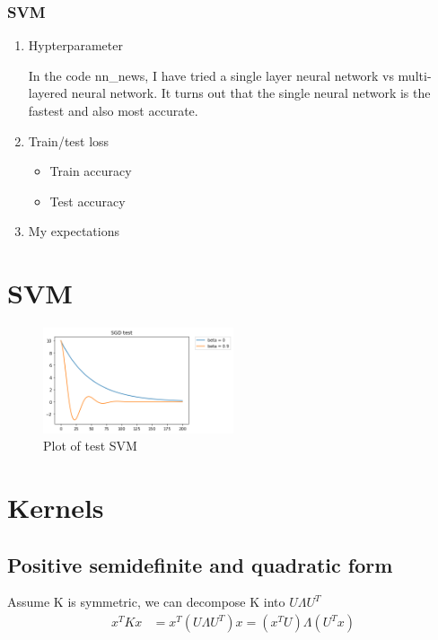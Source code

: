 \documentclass[letterpaper, 12]{article}
\begin{document}
\subsubsection{SVM}
\begin{enumerate}

    \item Hypterparameter
	
	In the code nn\_news, I have tried a single layer neural network vs multi-layered neural network. It turns out that the single neural network is the fastest and also most accurate.

	\item Train/test loss
	\begin{itemize}
     \item  Train accuracy
     \item Test accuracy
        \end{itemize}
      \item My expectations
  
\end{enumerate}

\section{SVM}
\begin{figure}[H]
\centering
\includegraphics[width=0.5\textwidth]{q2part1plot.png}
\caption{\label{}Plot of test SVM}
\end{figure}


\section{Kernels}
\subsection{Positive semidefinite and quadratic form}
Assume K is symmetric, we can decompose K into $U \Lambda U^T$
\begin{equation*}
\begin{split}
x^T K x &= x^T (U \Lambda U^T) x = (x^T U) \Lambda (U^T x)\\
\end{split}
\end{equation*}
\end{document}
